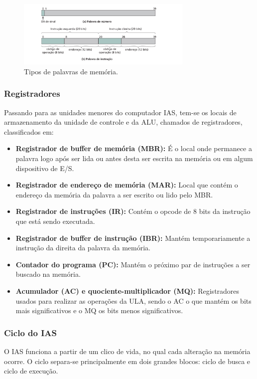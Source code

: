 \documentclass{article}
\begin{document}
\begin{figure}[H]
   \centering
   \includegraphics[width=0.75\textwidth]{palavras.png}
   \caption{Tipos de palavras de memória.}
\end{figure}

\subsubsection{Registradores}
Passando para as unidades menores do computador IAS, tem-se os locais de
armazenamento da unidade de controle e da ALU, chamados de registradores,
classificados em:

\begin{itemize}
    \item \textbf{Registrador de buffer de memória (MBR):} É o local onde permanece
        a palavra logo após ser lida ou antes desta ser escrita na memória ou
        em algum dispositivo de E/S.
    \item \textbf{Registrador de endereço de memória (MAR):} Local que contém o
        endereço da memória da palavra a ser escrito ou lido pelo MBR.
    \item \textbf{Registrador de instruções (IR):} Contém o opcode de 8 bits da
        instrução que está sendo executada.
    \item \textbf{Registrador de buffer de instrução (IBR):} Mantém temporariamente
        a instrução da direita da palavra da memória.
    \item \textbf{Contador do programa (PC):} Mantém o próximo par de instruções a
        ser buscado na memória.
    \item \textbf{Acumulador (AC) e quociente-multiplicador (MQ):} Registradores
        usados para realizar as operações da ULA, sendo o AC o que mantém
        os bits mais significativos e o MQ os bits menos significativos.
\end{itemize}

\subsubsection{Ciclo do IAS}
O IAS funciona a partir de um clico de vida, no qual cada alteração na memória
ocorre. O ciclo separa-se principalmente em dois grandes blocos: ciclo de busca
e ciclo de execução.
\end{document}
